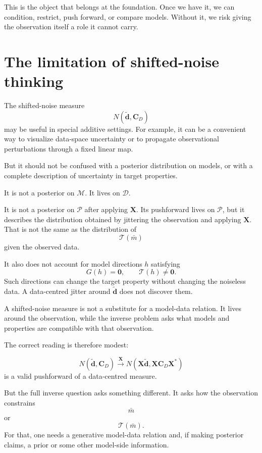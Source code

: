 \documentclass[11pt,openany]{book}
\theoremstyle{definition}
\theoremstyle{remark}
\newcommand{\M}{\mathcal M}
\newcommand{\D}{\mathcal D}
\newcommand{\Pspace}{\mathcal P}
\newcommand{\Tau}{\mathcal{T}}
\begin{document}
This is the object that belongs at the foundation. Once we have it, we can condition, restrict,
push forward, or compare models. Without it, we risk giving the observation itself a role it
cannot carry.

\section{The limitation of shifted-noise thinking}

The shifted-noise measure
\[
  N(\widetilde{\mathbf d},\mathbf C_D)
\]
may be useful in special additive settings. For example, it can be a convenient way to visualize
data-space uncertainty or to propagate observational perturbations through a fixed linear map.

But it should not be confused with a posterior distribution on models, or with a complete
description of uncertainty in target properties.

It is not a posterior on \(\M\). It lives on \(\D\).

It is not a posterior on \(\Pspace\) after applying \(\mathbf X\). Its pushforward lives on
\(\Pspace\), but it describes the distribution obtained by jittering the observation and applying
\(\mathbf X\). That is not the same as the distribution of
\[
  \Tau(\bar m)
\]
given the observed data.

It also does not account for model directions \(h\) satisfying
\[
  G(h)=\mathbf 0,
  \qquad
  \Tau(h)\neq\mathbf 0.
\]
Such directions can change the target property without changing the noiseless data. A
data-centred jitter around \(\widetilde{\mathbf d}\) does not discover them.

\begin{warningbox}
A shifted-noise measure is not a substitute for a model-data relation. It lives around the
observation, while the inverse problem asks what models and properties are compatible with that
observation.
\end{warningbox}

The correct reading is therefore modest:

\[
  N(\widetilde{\mathbf d},\mathbf C_D)
  \xrightarrow{\;\mathbf X\;}
  N(\mathbf X\widetilde{\mathbf d},\mathbf X\mathbf C_D\mathbf X^*)
\]
is a valid pushforward of a data-centred measure.

But the full inverse question asks something different. It asks how the observation constrains
\[
  \bar m
\]
or
\[
  \Tau(\bar m).
\]
For that, one needs a generative model-data relation and, if making posterior claims, a prior or
some other model-side information.
\end{document}
